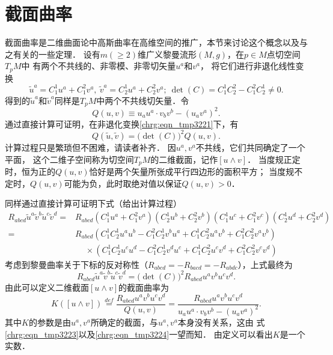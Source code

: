 
\section{截面曲率}\label{chrg:sec_sectional-curvature}
截面曲率是二维曲面论中高斯曲率在高维空间的推广，本节来讨论这个概念以及与之有关的一些定理．
设有$m(\geqslant 2)$维广义黎曼流形$(M,g)$，在$p\in M$点切空间$T_pM$中
有两个不共线的、非零模、非零切矢量$u^a$和$v^a$，
将它们进行非退化线性变换
\begin{equation}\label{chrg:eqn_tmp3221}
    \tilde{u}^a = C_1^1 u^a +C_1^2 v^a, \ \tilde{v}^a = C_2^1 u^a +C_2^2 v^a;
    \ \det(C) = C_1^1C_2^2 - C_1^2 C^1_2\neq 0 .
\end{equation}
得到的$\tilde{u}^a$和$\tilde{v}^a$同样是$T_pM$中两个不共线切矢量．令
\begin{equation}\label{chrg:eqn_tmp3222}
    Q(u,v)\equiv {u}_a{u}^a \cdot {v}_b{v}^b - ({u}_a{v}^a)^2 .
\end{equation}
通过直接计算可证明，在非退化变换\eqref{chrg:eqn_tmp3221}下，有
\begin{equation}\label{chrg:eqn_tmp3223}
    Q(\tilde{u},\tilde{v}) = \bigl(\det(C)\bigr)^2 Q(u,v) .
\end{equation}
计算过程只是繁琐但不困难，请读者补齐．
因$u^a,v^a$不共线，它们共同确定了一个平面，
这个二维子空间称为切空间$T_pM$的{\heiti 二维截面}，记作$[u\wedge v]$．
当度规正定时，恒为正的$Q(u,v)$恰好是两个矢量所张成平行四边形的面积平方；
当度规不定时，$Q(u,v)$可能为负，此时取绝对值以保证$Q(u,v)>0$．

同样通过直接计算可证明下式（给出计算过程）
\begin{align*}
    R_{abcd}\tilde{u}^a\tilde{v}^b\tilde{u}^c\tilde{v}^d = & R_{abcd}
    (C_1^1 u^a +C_1^2 v^a) (C_2^1 u^b +C_2^2 v^b)(C_1^1 u^c +C_1^2 v^c) (C_2^1 u^d +C_2^2 v^d) \\
    =&R_{abcd}(C_1^1 C_2^1 u^a u^b -C_1^2 C_2^1 v^b u^a+ C_1^1 C_2^2 u^a v^b +C_1^2 C_2^2 v^a v^b) \\
    &\phantom{R_{a}}\times (C_1^1 C_2^1 u^c u^d -C_1^2 C_2^1 v^d u^c+ C_1^1 C_2^2 u^c v^d +C_1^2 C_2^2 v^c v^d)
\end{align*}
考虑到黎曼曲率关于下标的反对称性（$R_{abcd}=-R_{bacd}=-R_{abdc}$），上式最终为
\begin{equation}\label{chrg:eqn_tmp3224}
    R_{abcd}\tilde{u}^a\tilde{v}^b\tilde{u}^c\tilde{v}^d = \bigl(\det(C)\bigr)^2 R_{abcd} u^a v^b u^c v^d .
\end{equation}
由此可以定义二维截面$[u\wedge v]$的{\heiti 截面曲率}为
\begin{equation}\label{chrg:eqn_sectional-curvature}
    K([u\wedge v]) \overset{def}{=}  \frac{R_{abcd} u^a v^b u^c v^d}{Q(u,v)} 
    = \frac{R_{abcd} u^a v^b u^c v^d}{{u}_a{u}^a \cdot {v}_b{v}^b - ({u}_a{v}^a)^2 } .
\end{equation}
其中$K$的参数是由$u^a,v^a$所确定的截面，与$u^a,v^a$本身没有关系，这由
式\eqref{chrg:eqn_tmp3223}以及\eqref{chrg:eqn_tmp3224}一望而知．
由定义可以看出$K$是一个实数．

